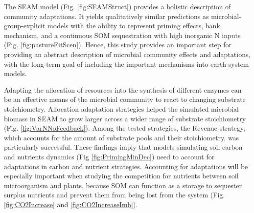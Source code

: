 \conclusions
The SEAM model (Fig. \ref{fig:SEAMStruct}) provides a holistic description of
community adaptations. It yields qualitatively similar predictions as
microbial-group-explicit models with the ability to represent priming effects,
bank mechanism, and a continuous SOM sequestration with high inorganic N inputs
(Fig. \ref{fig:pastureFitScen}). Hence, this study provides an important step
for providing an abstract description of microbial community effects and
adaptations, with the long-term goal of including the important mechanisms into
earth system models.

Adapting the allocation of resources into the synthesis of different enzymes can
be an effective means of the microbial community to react to changing substrate
stoichiometry. Allocation adaptation strategies helped the simulated microbial
biomass in SEAM to grow larger across a wider range of substrate stoichiometry
(Fig. \ref{fig:VarNNoFeedback}). Among the tested strategies, the Revenue
strategy, which accounts for the amount of substrate pools and their
stoichiometry, was particularly successful.
These findings imply that models simulating soil carbon and nutrients dynamics
(Fig \ref{fig:PrimingMinDec}) need to account for adaptations in carbon and
nutrient strategies. Accounting for adaptations will be especially important
when studying the competition for nutrients between soil microorganism and
plants, because SOM can function as a storage to sequester surplus nutrients and
prevent them from being lost from the system (Fig.
\ref{fig:CO2Increase} and \ref{fig:CO2IncreaseImb}).



